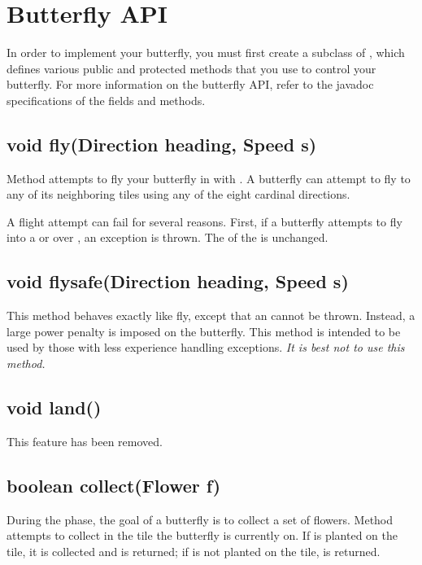 \documentclass{pset}
\newcommand{\removed}{This feature has been removed.}
\begin{document}
\ifx \BUTTERFLYAPI \undefined \else
\section{Butterfly API}\label{sec:api}
In order to implement your butterfly, you must first create a subclass of
, which defines various public and protected methods
that you use to control your butterfly. For more information on the butterfly
API, refer to the javadoc specifications of the fields and methods.

\ifx \VOIDFLY \undefined \else
\subsection{void fly(Direction heading, Speed s)}
Method  attempts to fly your butterfly in 
with  . A butterfly can attempt to fly to any of its neighboring
tiles using any of the eight cardinal directions.

A flight attempt can fail for several reasons. First, if a butterfly attempts
to fly into a  or over , an
 exception is thrown. The  of
the  is unchanged. 
\fi

\ifx \VOIDFLYSAFE \undefined \else
\subsection{void flysafe(Direction heading, Speed s)}
This method behaves exactly like fly, except that an
 cannot be thrown. Instead, a large power
penalty is imposed on the butterfly. This method is intended to be used by
those with less experience handling exceptions. \emph{It is best not to use
this method.}
\fi

\ifx \VOIDLAND \undefined \else
\subsection{void land()}
\removed{}
\fi

\ifx \BOOLEANCOLLECT \undefined \else
\subsection{boolean collect(Flower f)}
During the  phase, the goal of a butterfly is to collect a set of
flowers. Method  attempts to collect  in the tile
the butterfly is currently on. If  is planted on the tile, it is
collected and  is returned; if   is not planted on the tile,
 is returned. 
\fi
\end{document}
